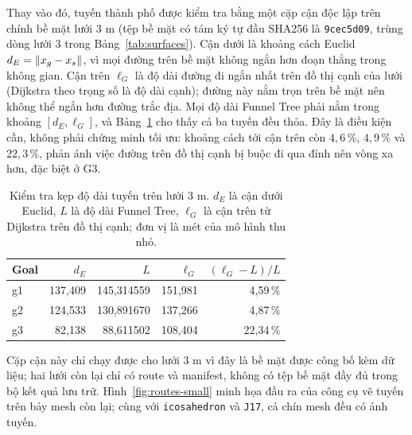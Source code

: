 Thay vào đó, tuyến thành phố được kiểm tra bằng một cặp cận độc lập trên chính bề
mặt lưới $3$ m (tệp bề mặt có tám ký tự đầu SHA256 là \texttt{9cec5d09}, trùng
dòng lưới $3$ trong Bảng~\ref{tab:surfaces}). Cận dưới là khoảng cách Euclid $d_E=\left\lVert x_g-x_s \right\rVert$, vì mọi đường
trên bề mặt không ngắn hơn đoạn thẳng trong không gian. Cận trên $\ell_G$ là độ
dài đường đi ngắn nhất trên đồ thị cạnh của lưới (Dijkstra theo trọng số là độ dài
cạnh); đường này nằm trọn trên bề mặt nên không thể ngắn hơn đường trắc địa. Mọi
độ dài Funnel Tree phải nằm trong khoảng $[d_E,\ell_G]$, và Bảng~\ref{tab:bounds}
cho thấy cả ba tuyến đều thỏa. Đây là điều kiện cần, không phải chứng minh tối ưu:
khoảng cách tới cận trên còn $4{,}6\,\%$, $4{,}9\,\%$ và $22{,}3\,\%$, phản ánh
việc đường trên đồ thị cạnh bị buộc đi qua đỉnh nên vòng xa hơn, đặc biệt ở G3.

\begin{table}[!t]
  \caption{Kiểm tra kẹp độ dài tuyến trên lưới $3$ m. $d_E$ là cận dưới Euclid,
    $L$ là độ dài Funnel Tree, $\ell_G$ là cận trên từ Dijkstra trên đồ thị cạnh;
    đơn vị là mét của mô hình thu nhỏ.}
  \label{tab:bounds}
  {\fontsize{6.5}{8}\selectfont
  \setlength{\tabcolsep}{3pt}%
  \begin{tabular}{@{}lrrrr@{}}
    \toprule
    Goal & $d_E$ & $L$ & $\ell_G$ & $(\ell_G{-}L)/L$ \\
    \midrule
    g1 & 137,409 & 145,314559 & 151,981 & 4,59\,\% \\
    g2 & 124,533 & 130,891670 & 137,266 & 4,87\,\% \\
    g3 &  82,138 &  88,611502 & 108,404 & 22,34\,\% \\
    \bottomrule
  \end{tabular}}
\end{table}

Cặp cận này chỉ chạy được cho lưới $3$ m vì đây là bề mặt được công bố kèm dữ
liệu; hai lưới còn lại chỉ có route và manifest, không có tệp bề mặt đầy đủ trong
bộ kết quả lưu trữ. Hình~\ref{fig:routes-small} minh họa đầu ra của công cụ vẽ tuyến trên
bảy mesh còn lại; cùng với \texttt{icosahedron} và \texttt{J17}, cả chín mesh đều
có ảnh tuyến.

